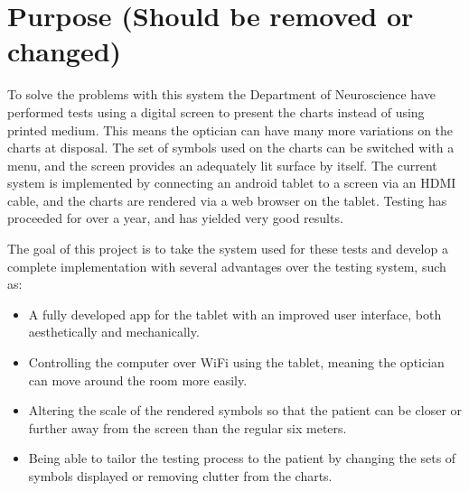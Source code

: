 \documentclass[12pt,a4paper,notitlepage]{report}
\begin{document}


\section{Purpose (Should be removed or changed)}
To solve the problems with this system the Department of Neuroscience have performed tests using a digital screen to present the charts instead of using printed medium. This means the optician can have many more variations on the charts at disposal. The set of symbols used on the charts can be switched with a menu, and the screen provides an adequately lit surface by itself. The current system is implemented by connecting an android tablet to a screen via an HDMI cable, and the charts are rendered via a web browser on the tablet. Testing has proceeded for over a year, and has yielded very good results.

The goal of this project is to take the system used for these tests and develop a complete implementation with several advantages over the testing system, such as:

\begin{itemize}
	\item A fully developed app for the tablet with an improved user interface, both aesthetically and mechanically.
	\item Controlling the computer over WiFi using the tablet, meaning the optician can move around the room more easily.
	\item Altering the scale of the rendered symbols so that the patient can be closer or further away from the screen than the regular six meters.
	\item Being able to tailor the testing process to the patient by changing the sets of symbols displayed or removing clutter from the charts.
\end{itemize}
	
\end{document}
